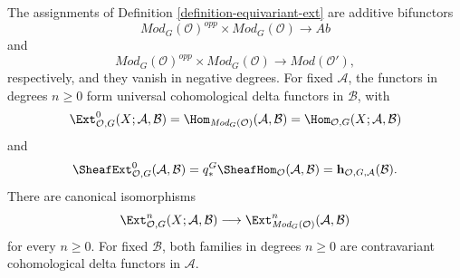 \begin{lemma}
\label{lemma-equivariant-ext-properties}
\begin{reference}
\cite[Chapter V, \S 5.6, p. 214]{Tohoku}
\end{reference}
The assignments of Definition \ref{definition-equivariant-ext} are additive
bifunctors
$$
\textit{Mod}_G(\mathcal O)^{opp}\times
\textit{Mod}_G(\mathcal O)
\longrightarrow
\textit{Ab}
$$
and
$$
\textit{Mod}_G(\mathcal O)^{opp}\times
\textit{Mod}_G(\mathcal O)
\longrightarrow
\textit{Mod}(\mathcal O'),
$$
respectively, and they vanish in negative degrees. For fixed $\mathcal A$,
the functors in degrees $n\geq 0$ form universal cohomological delta functors
in $\mathcal B$, with
$$
\Ext^0_{\mathcal O,G}(X;\mathcal A,\mathcal B)
=
\Hom_{\textit{Mod}_G(\mathcal O)}(\mathcal A,\mathcal B)
=
\Hom_{\mathcal O,G}(X;\mathcal A,\mathcal B)
$$
and
$$
\SheafExt^0_{\mathcal O,G}(\mathcal A,\mathcal B)
=
q_*^G\SheafHom_{\mathcal O}(\mathcal A,\mathcal B)
=
\mathbf h_{\mathcal O,G,\mathcal A}(\mathcal B).
$$
There are canonical isomorphisms
$$
\Ext^n_{\mathcal O,G}(X;\mathcal A,\mathcal B)
\longrightarrow
\Ext^n_{\textit{Mod}_G(\mathcal O)}(\mathcal A,\mathcal B)
$$
for every $n\geq 0$. For fixed $\mathcal B$, both families in degrees
$n\geq 0$ are contravariant cohomological delta functors in $\mathcal A$.
\end{lemma}

